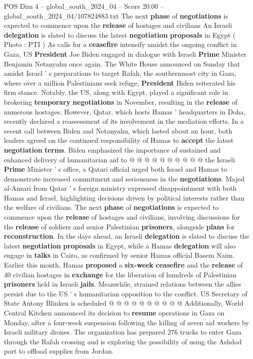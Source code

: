 \begin{textsample}{POS Dim 4 – global\_south\_2024\_04 – Score 20.00 – global\_south\_2024\_04/107824883.txt}  \label{ex:f4_pos_268}
The next \textbf{phase} of \textbf{negotiations} is expected to commence upon the \textbf{release} of hostages and civilians An Israeli \textbf{delegation} is slated to discuss the latest \textbf{negotiation} \textbf{proposals} in Egypt ( Photo : PTI ) As calls for a \textbf{ceasefire} intensify amidst the ongoing conflict in Gaza, US \textbf{President} Joe Biden engaged in dialogue with Israeli \textbf{Prime} Minister Benjamin Netanyahu once again.
The White House announced on Sunday that amidst Israel ' s preparations to target Rafah, the southernmost city in Gaza, where over a million Palestinians seek refuge, \textbf{President} Biden reiterated his firm stance.
Notably, the US, along with Egypt, played a significant role in brokering \textbf{temporary} \textbf{negotiations} in November, resulting in the \textbf{release} of numerous hostages.
However, Qatar, which hosts Hamas ' headquarters in Doha, recently declared a reassessment of its involvement in the mediation efforts.
In a recent call between Biden and Netanyahu, which lasted about an hour, both leaders agreed on the continued responsibility of Hamas to \textbf{accept} the latest \textbf{negotiation} \textbf{terms}.
Biden emphasized the importance of sustained and enhanced delivery of humanitarian aid to @ @ @ @ @ @ @ @ @ @ the Israeli \textbf{Prime} Minister ' s office, a Qatari official urged both Israel and Hamas to demonstrate increased commitment and seriousness in the \textbf{negotiations}.
Majed al-Ansari from Qatar ' s foreign ministry expressed disappointment with both Hamas and Israel, highlighting decisions driven by political interests rather than the welfare of civilians.
The next \textbf{phase} of \textbf{negotiations} is expected to commence upon the \textbf{release} of hostages and civilians, involving discussions for the \textbf{release} of soldiers and senior Palestinian \textbf{prisoners}, alongside \textbf{plans} for \textbf{reconstruction}.
In the days ahead, an Israeli \textbf{delegation} is slated to discuss the latest \textbf{negotiation} \textbf{proposals} in Egypt, while a Hamas \textbf{delegation} will also engage in \textbf{talks} in Cairo, as confirmed by senior Hamas official Basem Naim.
Earlier this month, Hamas \textbf{proposed} a \textbf{six-week} \textbf{ceasefire} and the \textbf{release} of 40 civilian hostages in \textbf{exchange} for the liberation of hundreds of Palestinian \textbf{prisoners} held in Israeli \textbf{jails}.
Meanwhile, strained relations between the allies persist due to the US ' s humanitarian opposition to the conflict.
US Secretary of State Antony Blinken is scheduled @ @ @ @ @ @ @ @ @ @ Additionally, World Central Kitchen announced its decision to \textbf{resume} operations in Gaza on Monday, after a four-week suspension following the killing of seven aid workers by Israeli military drones.
The organization has prepared 276 trucks to enter Gaza through the Rafah crossing and is exploring the possibility of using the Ashdod port to offload supplies from Jordan.


\end{textsample}
